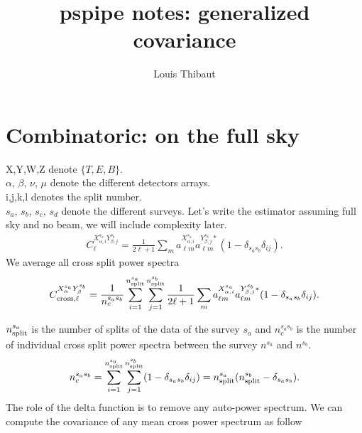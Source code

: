 \documentclass[a4paper, 11pt]{article}
\def\ba{\begin{eqnarray}}
\def\ea{\end{eqnarray}}
\begin{document}
\title{\textbf{pspipe notes: generalized covariance}}
\author{Louis Thibaut}
\maketitle

\section{Combinatoric: on the full sky}

X,Y,W,Z denote $\{T, E, B \}$. \\
$\alpha$, $\beta$, $\nu$, $\mu$ denote the different detectors arrays. \\
i,j,k,l denotes the split number. \\
$s_{a}$, $s_{b}$, $s_{c}$, $s_{d}$ denote the different surveys.
Let's write the estimator assuming full sky and no beam, we will include complexity later.
\ba
C^{X^{s_{a}}_{\alpha, i} Y^{s_{b}}_{\beta, j}}_{\ell} = \frac{1}{2\ell +1} \sum_{m} a^{X^{s_{a}}_{\alpha, i} }_{\ell m}  a^{Y^{s_{b}}_{\beta, j}*}_{\ell m} (1-\delta_{s_{a}s_{b}}\delta_{ij}) .
\ea
We average all cross split power spectra
\ba
C^{X^{s_{a}}_{\alpha} Y^{s_{b}}_{\beta}}_{\rm cross, \ell} =  \frac{1}{ n^{s_{a} s_{b}}_{c}} \sum^{n^{s_{a}}_{\rm split}}_{i=1} \sum^{n^{s_{b}}_{\rm split}}_{j=1} \frac{1}{2\ell +1} \sum_{m} a^{X^{s_{a}}_{\alpha, i} }_{\ell m}  a^{Y^{s_{b}}_{\beta, j}*}_{\ell m} (1-\delta_{s_{a}s_{b}}\delta_{ij}) .
\ea

$n^{s_{a}}_{\rm split}$ is the number of splits of the data of the survey $s_{a}$ and  $n^{s_{a} s_{b}}_{c}$ is the number of individual cross split power spectra between the survey $n^{s_{a}}$ and $n^{s_{b}}$. 
\ba
n^{s_{a} s_{b}}_{c} =  \sum^{n^{s_{a}}_{\rm split}}_{i=1} \sum^{n^{s_{b}}_{\rm split}}_{j=1}  (1-\delta_{s_{a}s_{b}}\delta_{ij})  = n^{s_{a}}_{\rm split}( n^{s_{b}}_{\rm split} -  \delta_{s_{a}s_{b}}) .
\ea
The role of the delta function is to remove any auto-power spectrum. 
We can compute the covariance of any mean cross power spectrum as follow
\end{document}
